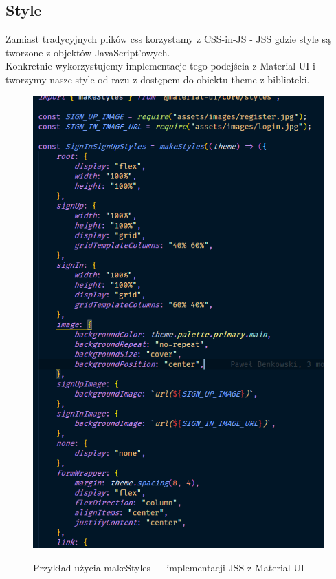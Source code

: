 \documentclass[a4paper,11pt]{report}
\begin{document}
\subsection{Style}
\label{subsec:style}
Zamiast tradycyjnych plików css korzystamy z CSS-in-JS - JSS gdzie style są tworzone z objektów JavaScript'owych.\\
Konkretnie wykorzystujemy implementacje tego podejścia z Material-UI i tworzymy nasze style od razu z dostępem do obiektu theme z biblioteki.
\begin{figure}[H]
	\centering
	\includegraphics[scale=0.5]{implementacja/frontend/jss_styles}\\
	\caption{Przykład użycia makeStyles — implementacji JSS z Material-UI}
	\label{fig:jss_styles}
\end{figure}
\end{document}
